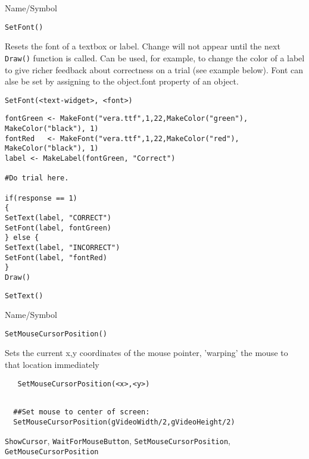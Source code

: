 \begin{desc}{Name/Symbol}
\item[Name/Symbol] 	\verb+SetFont()+

\item[Description] Resets the font of a textbox or label.  Change will
  not appear until the next \verb+Draw()+ function is called.  Can be
  used, for example, to change the color of a label to give richer
  feedback about correctness on a trial (see example below).  Font can
alse be set by assigning to the object.font property of an object.

\item[Usage]
\begin{verbatim}
SetFont(<text-widget>, <font>)
\end{verbatim}

\item[Example]   	
\begin{verbatim}
fontGreen <- MakeFont("vera.ttf",1,22,MakeColor("green"),
MakeColor("black"), 1)
fontRed   <- MakeFont("vera.ttf",1,22,MakeColor("red"),
MakeColor("black"), 1)
label <- MakeLabel(fontGreen, "Correct")

#Do trial here.       	

if(response == 1)
{
SetText(label, "CORRECT")
SetFont(label, fontGreen)
} else {
SetText(label, "INCORRECT")
SetFont(label, "fontRed)
}
Draw()
\end{verbatim}

\item[See Also]    	\verb+SetText()+
\end{desc}

\rl


\begin{desc}{Name/Symbol}
\item[Name/Symbol]	\verb+SetMouseCursorPosition()+

\item[Description] Sets the current x,y coordinates of the mouse
  pointer, 'warping' the mouse to that location immediately

\item[Usage]
\begin{verbatim}
   SetMouseCursorPosition(<x>,<y>)
\end{verbatim}

\item[Example]	
\begin{verbatim}

  ##Set mouse to center of screen:
  SetMouseCursorPosition(gVideoWidth/2,gVideoHeight/2)
\end{verbatim}


\item[See Also]
  \verb+ShowCursor+, \verb+WaitForMouseButton+,
  \verb+SetMouseCursorPosition+, \verb+GetMouseCursorPosition+
\end{desc}

